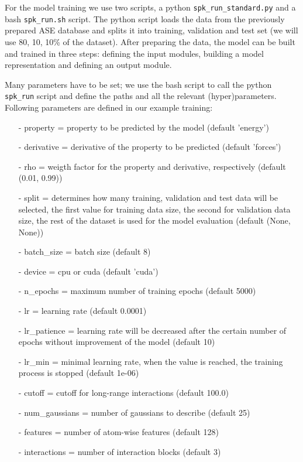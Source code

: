 For the model training we use two scripts, a python \texttt{spk\_run\_standard.py} and a bash \texttt{spk\_run.sh} script. The python script loads the data from the previously prepared ASE database and splits it into training, validation and test set (we will use 80, 10, 10\% of the dataset). After preparing the data, the model can be built and trained in three steps: defining the input modules, building a model representation and defining an output module.

Many parameters have to be set; we use the bash script to call the python 
\texttt{spk\_run} script and define the paths and all the relevant (hyper)parameters.
Following parameters are defined in our example training:
\begin{enumerate}
    \item[-] property = property to be predicted by the model (default 'energy')
    \item[-] derivative = derivative of the property to be predicted (default 'forces')
    \item[-] rho = weigth factor for the property and derivative, respectively (default (0.01, 0.99))
    \item[-] split = determines how many training, validation and test data will be selected, the first value for training data size, the second for validation data size, the rest of the dataset is used for the model evaluation (default (None, None))
    \item[-] batch\_size = batch size (default 8)
    \item[-] device = cpu or cuda (default 'cuda')
    \item[-] n\_epochs = maximum number of training epochs (default 5000)
    \item[-] lr = learning rate (default 0.0001)
    \item[-] lr\_patience = learning rate will be decreased after the certain number of epochs without improvement of the model (default 10)
    \item[-] lr\_min = minimal learning rate, when the value is reached, the training process is stopped (default 1e-06)
    \item[-] cutoff = cutoff for long-range interactions (default 100.0)
    \item[-] num\_gaussians = number of gaussians to describe (default 25)
    \item[-] features = number of atom-wise features (default 128)
    \item[-] interactions = number of interaction blocks (default 3)
\end{enumerate}

